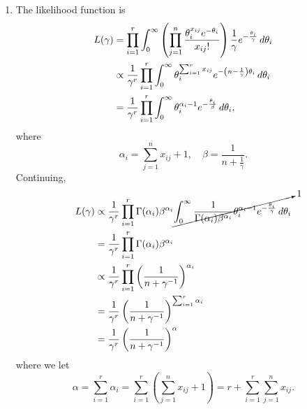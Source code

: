 \documentclass[notoc,notitlepage]{tufte-book}
\begin{document}
\begin{solution}
  \begin{enumerate}
    \item The likelihood function is
      \begin{align*}
        L(\gamma)
        &= \prod_{i=1}^{r} \int_{0}^{\infty} \left( 
          \prod_{j=1}^{n} \frac{\theta_i^{x_{ij}} e^{-\theta_i}}{x_{ij}!}
        \right) \frac{1}{\gamma} e^{-\frac{\theta_i}{\gamma}} \mathop{}\!d{\theta_i} \\
        &\propto \frac{1}{\gamma^r} \prod_{i=1}^{r} \int_{0}^{\infty}
          \theta_i^{ \sum_{i=1}^{r} x_{ij} }
          e^{ - \left( n - \frac{1}{\gamma} \right) \theta_i } \mathop{}\!d{\theta_i} \\
        &= \frac{1}{\gamma^r} \prod_{i=1}^{r} \int_{0}^{\infty}
          \theta_i^{\alpha_i - 1} e^{-\frac{\theta_i}{\beta}} \mathop{}\!d{\theta_i},
      \end{align*}
      where
      \begin{equation*}
        \alpha_i = \sum_{j=1}^{n} x_{ij} + 1, \quad
        \beta = \frac{1}{n + \frac{1}{\gamma}}.
      \end{equation*}
      Continuing,
      \begin{align*}
        L(\gamma)
        &\propto \frac{1}{\gamma^r} \prod_{i=1}^{r}
        \Gamma(\alpha_i) \beta^{\alpha_i} \cancelto{1}{\int_{0}^{\infty}
          \frac{1}{\Gamma(\alpha_i) \beta^{\alpha_i}}
          \theta_i^{\alpha_i - 1} e^{-\frac{\theta_i}{\gamma}} \mathop{}\!d{\theta_i}} \\
        &= \frac{1}{\gamma^r} \prod_{i=1}^{r} \Gamma(\alpha_i) \beta^{\alpha_i} \\
        &\propto \frac{1}{\gamma^r} \prod_{i=1}^{r} \left( \frac{1}{n +
          \gamma^{-1}} \right)^{\alpha_i} \\
        &= \frac{1}{\gamma^r} \left(
          \frac{1}{n + \gamma^{-1}} \right)^{ \sum_{i=1}^{r} \alpha_i } \\
        &= \frac{1}{\gamma^r} \left( \frac{1}{n + \gamma^{-1}} \right)^\alpha
      \end{align*}
      where we let
      \begin{equation*}
        \alpha = \sum_{i=1}^{r} \alpha_i
          = \sum_{i=1}^{r} \left( \sum_{j=1}^{n} x_{ij} + 1 \right)
          = r + \sum_{i=1}^{r} \sum_{j=1}^{n} x_{ij}.
      \end{equation*}


\end{enumerate}
\end{solution}
\end{document}
